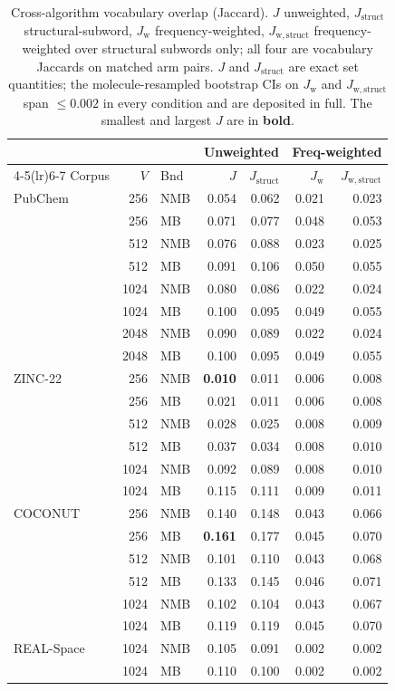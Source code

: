 \begin{table}[htbp]
  \centering
  \caption{Cross-algorithm vocabulary overlap (Jaccard). $J$ unweighted, $J_{\mathrm{struct}}$ structural-subword, $J_{\mathrm{w}}$ frequency-weighted, $J_{\mathrm{w,struct}}$ frequency-weighted over structural subwords only; all four are vocabulary Jaccards on matched arm pairs. $J$ and $J_{\mathrm{struct}}$ are exact set quantities; the molecule-resampled bootstrap CIs on $J_{\mathrm{w}}$ and $J_{\mathrm{w,struct}}$ span $\le 0.002$ in every condition and are deposited in full. The smallest and largest $J$ are in \textbf{bold}.}
  \label{tab:results-jaccards}
  \footnotesize
  \begin{tabular}{@{}l r l r r r r@{}}
    \toprule
    & & & \multicolumn{2}{c}{Unweighted} & \multicolumn{2}{c}{Freq-weighted} \\
    \cmidrule(lr){4-5}\cmidrule(lr){6-7}
    Corpus & $V$ & Bnd & $J$ & $J_{\mathrm{struct}}$ & $J_{\mathrm{w}}$ & $J_{\mathrm{w,struct}}$ \\
    \midrule
    PubChem & 256 & NMB & 0.054 & 0.062 & 0.021 & 0.023 \\
     & 256 & MB & 0.071 & 0.077 & 0.048 & 0.053 \\
     & 512 & NMB & 0.076 & 0.088 & 0.023 & 0.025 \\
     & 512 & MB & 0.091 & 0.106 & 0.050 & 0.055 \\
     & 1024 & NMB & 0.080 & 0.086 & 0.022 & 0.024 \\
     & 1024 & MB & 0.100 & 0.095 & 0.049 & 0.055 \\
     & 2048 & NMB & 0.090 & 0.089 & 0.022 & 0.024 \\
     & 2048 & MB & 0.100 & 0.095 & 0.049 & 0.055 \\
    \addlinespace
    ZINC-22 & 256 & NMB & \textbf{0.010} & 0.011 & 0.006 & 0.008 \\
     & 256 & MB & 0.021 & 0.011 & 0.006 & 0.008 \\
     & 512 & NMB & 0.028 & 0.025 & 0.008 & 0.009 \\
     & 512 & MB & 0.037 & 0.034 & 0.008 & 0.010 \\
     & 1024 & NMB & 0.092 & 0.089 & 0.008 & 0.010 \\
     & 1024 & MB & 0.115 & 0.111 & 0.009 & 0.011 \\
    \addlinespace
    COCONUT & 256 & NMB & 0.140 & 0.148 & 0.043 & 0.066 \\
     & 256 & MB & \textbf{0.161} & 0.177 & 0.045 & 0.070 \\
     & 512 & NMB & 0.101 & 0.110 & 0.043 & 0.068 \\
     & 512 & MB & 0.133 & 0.145 & 0.046 & 0.071 \\
     & 1024 & NMB & 0.102 & 0.104 & 0.043 & 0.067 \\
     & 1024 & MB & 0.119 & 0.119 & 0.045 & 0.070 \\
    \addlinespace
    REAL-Space & 1024 & NMB & 0.105 & 0.091 & 0.002 & 0.002 \\
     & 1024 & MB & 0.110 & 0.100 & 0.002 & 0.002 \\
    \bottomrule
  \end{tabular}
\end{table}
